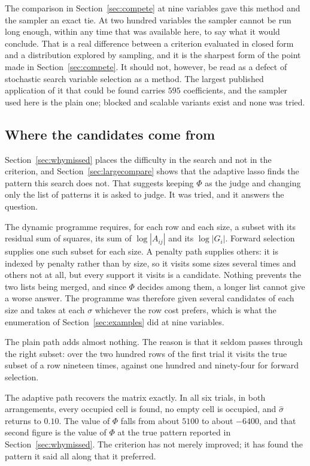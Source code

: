 The comparison in Section~\ref{sec:compete} at nine variables gave this method and
the sampler an exact tie. At two hundred variables the sampler cannot be run long
enough, within any time that was available here, to say what it would conclude. That
is a real difference between a criterion evaluated in closed form and a distribution
explored by sampling, and it is the sharpest form of the point made in
Section~\ref{sec:compete}. It should not, however, be read as a defect of stochastic
search variable selection as a method. The largest published application of it that
could be found carries $595$ coefficients, and the sampler used here is the plain
one; blocked and scalable variants exist and none was tried.

\subsection{Where the candidates come from}
\label{sec:candidates}

Section~\ref{sec:whymissed} places the difficulty in the search and not in the
criterion, and Section~\ref{sec:largecompare} shows that the adaptive lasso finds the
pattern this search does not. That suggests keeping $\Phi$ as the judge and changing
only the list of patterns it is asked to judge. It was tried, and it answers the
question.

The dynamic programme requires, for each row and each size, a subset with its
residual sum of squares, its sum of $\log |A_{ij}|$ and its $\log |G_{i}|$. Forward
selection supplies one such subset for each size. A penalty path supplies others: it
is indexed by penalty rather than by size, so it visits some sizes several times and
others not at all, but every support it visits is a candidate. Nothing prevents the
two lists being merged, and since $\Phi$ decides among them, a longer list cannot
give a worse answer. The programme was therefore given several candidates of each
size and takes at each $\sigma$ whichever the row cost prefers, which is what the
enumeration of Section~\ref{sec:examples} did at nine variables.



The plain path adds almost nothing. The reason is that it seldom passes through the
right subset: over the two hundred rows of the first trial it visits the true subset
of a row nineteen times, against one hundred and ninety-four for forward selection.

The adaptive path recovers the matrix exactly. In all six trials, in both
arrangements, every occupied cell is found, no empty cell is occupied, and
$\hat\sigma$ returns to $0.10$. The value of $\Phi$ falls from about $5100$ to about
$-6400$, and that second figure is the value of $\Phi$ at the true pattern reported
in Section~\ref{sec:whymissed}. The criterion has not merely improved; it has found
the pattern it said all along that it preferred.

